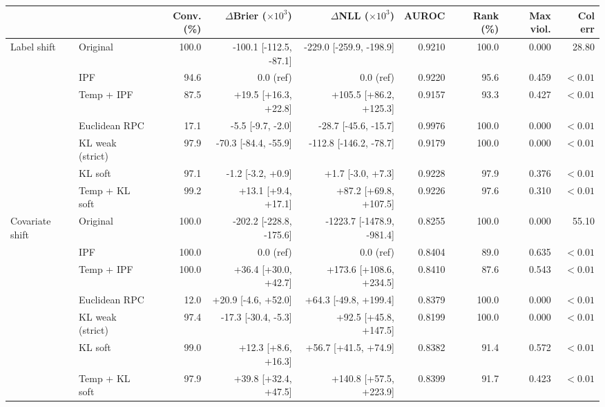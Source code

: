 \begin{tabular}{llrrrrrrr}
\toprule
 &  & Conv. (\%) & $\Delta$Brier ($\times 10^3$) & $\Delta$NLL ($\times 10^3$) & AUROC & Rank (\%) & Max viol. & Col err \\
\midrule
Label shift & Original & 100.0 & -100.1 [-112.5, -87.1] & -229.0 [-259.9, -198.9] & 0.9210 & 100.0 & 0.000 & 28.80 \\
 & IPF & 94.6 & 0.0 (ref) & 0.0 (ref) & 0.9220 & 95.6 & 0.459 & $<0.01$ \\
 & Temp + IPF & 87.5 & +19.5 [+16.3, +22.8] & +105.5 [+86.2, +125.3] & 0.9157 & 93.3 & 0.427 & $<0.01$ \\
 & Euclidean RPC & 17.1 & -5.5 [-9.7, -2.0] & -28.7 [-45.6, -15.7] & 0.9976 & 100.0 & 0.000 & $<0.01$ \\
 & KL weak (strict) & 97.9 & -70.3 [-84.4, -55.9] & -112.8 [-146.2, -78.7] & 0.9179 & 100.0 & 0.000 & $<0.01$ \\
 & KL soft & 97.1 & -1.2 [-3.2, +0.9] & +1.7 [-3.0, +7.3] & 0.9228 & 97.9 & 0.376 & $<0.01$ \\
 & Temp + KL soft & 99.2 & +13.1 [+9.4, +17.1] & +87.2 [+69.8, +107.5] & 0.9226 & 97.6 & 0.310 & $<0.01$ \\
Covariate shift & Original & 100.0 & -202.2 [-228.8, -175.6] & -1223.7 [-1478.9, -981.4] & 0.8255 & 100.0 & 0.000 & 55.10 \\
 & IPF & 100.0 & 0.0 (ref) & 0.0 (ref) & 0.8404 & 89.0 & 0.635 & $<0.01$ \\
 & Temp + IPF & 100.0 & +36.4 [+30.0, +42.7] & +173.6 [+108.6, +234.5] & 0.8410 & 87.6 & 0.543 & $<0.01$ \\
 & Euclidean RPC & 12.0 & +20.9 [-4.6, +52.0] & +64.3 [-49.8, +199.4] & 0.8379 & 100.0 & 0.000 & $<0.01$ \\
 & KL weak (strict) & 97.4 & -17.3 [-30.4, -5.3] & +92.5 [+45.8, +147.5] & 0.8199 & 100.0 & 0.000 & $<0.01$ \\
 & KL soft & 99.0 & +12.3 [+8.6, +16.3] & +56.7 [+41.5, +74.9] & 0.8382 & 91.4 & 0.572 & $<0.01$ \\
 & Temp + KL soft & 97.9 & +39.8 [+32.4, +47.5] & +140.8 [+57.5, +223.9] & 0.8399 & 91.7 & 0.423 & $<0.01$ \\
\bottomrule
\end{tabular}
